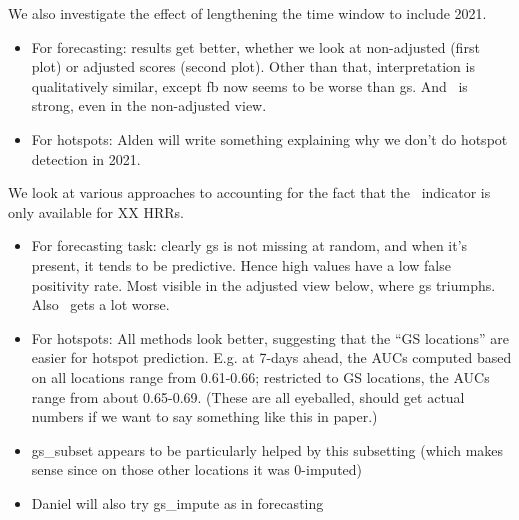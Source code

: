 


We also investigate the effect of lengthening the time window to include 2021. 
\begin{itemize}
\item For forecasting: results get better, whether we look at
  non-adjusted (first plot) or adjusted scores (second plot).  Other
  than that, interpretation is qualitatively similar, except fb now
  seems to be worse than gs.  And \chngcli~is strong, even in the
  non-adjusted view.
  \item For hotspots: Alden will write something explaining why we
    don't do hotspot detection in 2021.
\end{itemize}


We look at various approaches to
accounting for the fact that the \gs~indicator is only available
for XX HRRs.

\begin{itemize}
  \item For forecasting task: clearly gs is not missing at random, and when it's present, it tends to be predictive.  Hence high values have a low false positivity rate.  Most visible in the adjusted view below, where gs triumphs.  Also \chngcli~gets a lot worse.

\item For hotspots: All methods look better, suggesting that the “GS locations” are easier for hotspot prediction. E.g. at 7-days ahead, the AUCs computed based on all locations range from 0.61-0.66; restricted to GS locations, the AUCs range from about 0.65-0.69. (These are all eyeballed, should get actual numbers if we want to say something like this in paper.)
\item gs\_subset appears to be particularly helped by this subsetting
  (which makes sense since on those other locations it was 0-imputed)
  \item Daniel will also try gs\_impute as in forecasting
\end{itemize}



